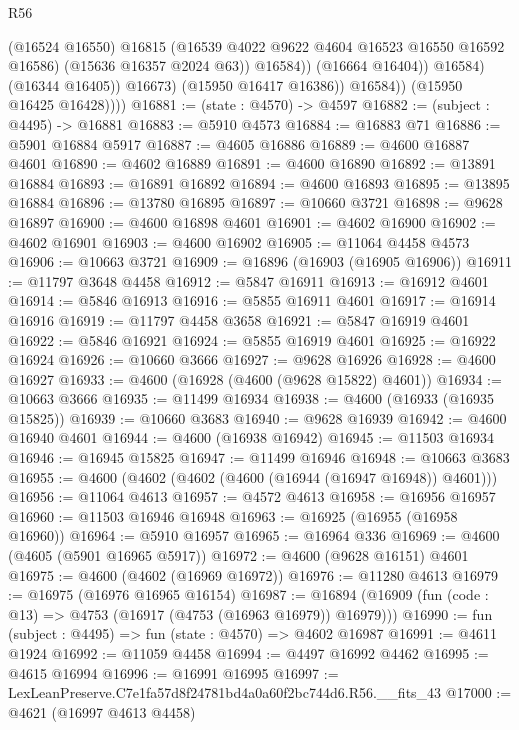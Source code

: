 \begin{lexlean}{R56}
\begin{coremodule}
                              (@16524 @16550)
                              @16815
                              (@16539 @4022 @9622 @4604 @16523 @16550 @16592 @16586)
                              (@15636 @16357 @2024 @63))
                            @16584))
                        (@16664 @16404))
                      @16584)
                    (@16344 @16405))
                  @16673)
                (@15950 @16417 @16386))
              @16584))
          (@15950 @16425 @16428))))
@16881 := (state : @4570) -> @4597
@16882 := (subject : @4495) -> @16881
@16883 := @5910 @4573
@16884 := @16883 @71
@16886 := @5901 @16884 @5917
@16887 := @4605 @16886
@16889 := @4600 @16887 @4601
@16890 := @4602 @16889
@16891 := @4600 @16890
@16892 := @13891 @16884
@16893 := @16891 @16892
@16894 := @4600 @16893
@16895 := @13895 @16884
@16896 := @13780 @16895
@16897 := @10660 @3721
@16898 := @9628 @16897
@16900 := @4600 @16898 @4601
@16901 := @4602 @16900
@16902 := @4602 @16901
@16903 := @4600 @16902
@16905 := @11064 @4458 @4573
@16906 := @10663 @3721
@16909 := @16896 (@16903 (@16905 @16906))
@16911 := @11797 @3648 @4458
@16912 := @5847 @16911
@16913 := @16912 @4601
@16914 := @5846 @16913
@16916 := @5855 @16911 @4601
@16917 := @16914 @16916
@16919 := @11797 @4458 @3658
@16921 := @5847 @16919 @4601
@16922 := @5846 @16921
@16924 := @5855 @16919 @4601
@16925 := @16922 @16924
@16926 := @10660 @3666
@16927 := @9628 @16926
@16928 := @4600 @16927
@16933 := @4600 (@16928 (@4600 (@9628 @15822) @4601))
@16934 := @10663 @3666
@16935 := @11499 @16934
@16938 := @4600 (@16933 (@16935 @15825))
@16939 := @10660 @3683
@16940 := @9628 @16939
@16942 := @4600 @16940 @4601
@16944 := @4600 (@16938 @16942)
@16945 := @11503 @16934
@16946 := @16945 @15825
@16947 := @11499 @16946
@16948 := @10663 @3683
@16955 := @4600 (@4602 (@4602 (@4600 (@16944 (@16947 @16948)) @4601)))
@16956 := @11064 @4613
@16957 := @4572 @4613
@16958 := @16956 @16957
@16960 := @11503 @16946 @16948
@16963 := @16925 (@16955 (@16958 @16960))
@16964 := @5910 @16957
@16965 := @16964 @336
@16969 := @4600 (@4605 (@5901 @16965 @5917))
@16972 := @4600 (@9628 @16151) @4601
@16975 := @4600 (@4602 (@16969 @16972))
@16976 := @11280 @4613
@16979 := @16975 (@16976 @16965 @16154)
@16987 := @16894 (@16909 (fun (code : @13) => @4753 (@16917 (@4753 (@16963 @16979)) @16979)))
@16990 := fun (subject : @4495) => fun (state : @4570) => @4602 @16987
@16991 := @4611 @1924
@16992 := @11059 @4458
@16994 := @4497 @16992 @4462
@16995 := @4615 @16994
@16996 := @16991 @16995
@16997 := LexLeanPreserve.C7e1fa57d8f24781bd4a0a60f2bc744d6.R56.__fits_43
@17000 := @4621 (@16997 @4613 @4458)

\end{coremodule}
\end{lexlean}
